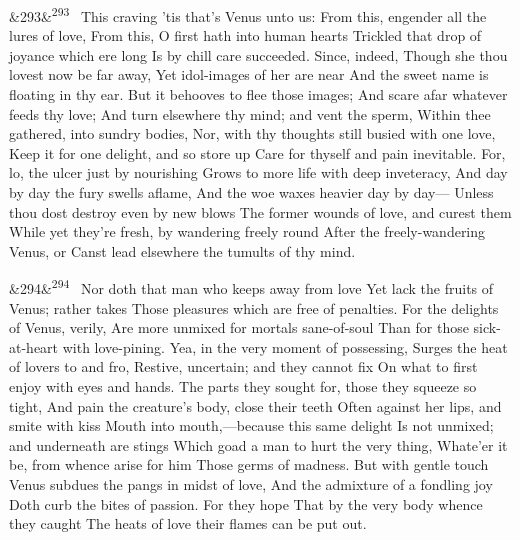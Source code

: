 \documentclass[12pt]{article}
\newcommand{\para}[1][]{\par\noindent\ifx&#1&\else\textsuperscript{\footnotesize #1}~\fi}
\begin{document}
\para[293] This craving 'tis that's Venus unto us: From this, engender all the lures of love, From this, O first hath into human hearts Trickled that drop of joyance which ere long Is by chill care succeeded. Since, indeed, Though she thou lovest now be far away, Yet idol-images of her are near And the sweet name is floating in thy ear. But it behooves to flee those images; And scare afar whatever feeds thy love; And turn elsewhere thy mind; and vent the sperm, Within thee gathered, into sundry bodies, Nor, with thy thoughts still busied with one love, Keep it for one delight, and so store up Care for thyself and pain inevitable. For, lo, the ulcer just by nourishing Grows to more life with deep inveteracy, And day by day the fury swells aflame, And the woe waxes heavier day by day--- Unless thou dost destroy even by new blows The former wounds of love, and curest them While yet they're fresh, by wandering freely round After the freely-wandering Venus, or Canst lead elsewhere the tumults of thy mind.

\para[294] Nor doth that man who keeps away from love Yet lack the fruits of Venus; rather takes Those pleasures which are free of penalties. For the delights of Venus, verily, Are more unmixed for mortals sane-of-soul Than for those sick-at-heart with love-pining. Yea, in the very moment of possessing, Surges the heat of lovers to and fro, Restive, uncertain; and they cannot fix On what to first enjoy with eyes and hands. The parts they sought for, those they squeeze so tight, And pain the creature's body, close their teeth Often against her lips, and smite with kiss Mouth into mouth,---because this same delight Is not unmixed; and underneath are stings Which goad a man to hurt the very thing, Whate'er it be, from whence arise for him Those germs of madness. But with gentle touch Venus subdues the pangs in midst of love, And the admixture of a fondling joy Doth curb the bites of passion. For they hope That by the very body whence they caught The heats of love their flames can be put out.
\end{document}
